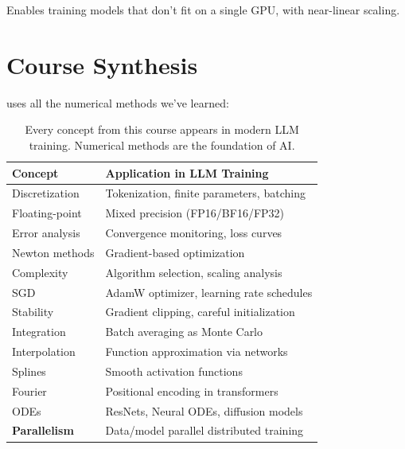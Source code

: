Enables training models that don't fit on a single GPU, with near-linear scaling.





\newpage
\section{Course Synthesis}

 uses all the numerical methods we've learned:

\begin{table}[ht]
\centering
\begin{tabular}{p{}p{}}
\toprule
\textbf{Concept} & \textbf{Application in LLM Training} \\
\midrule
Discretization & Tokenization, finite parameters, batching \\
Floating-point & Mixed precision (FP16/BF16/FP32) \\
Error analysis & Convergence monitoring, loss curves \\
Newton methods & Gradient-based optimization \\
Complexity & Algorithm selection, scaling analysis \\
SGD & AdamW optimizer, learning rate schedules \\
Stability & Gradient clipping, careful initialization \\
Integration & Batch averaging as Monte Carlo \\
Interpolation & Function approximation via networks \\
Splines & Smooth activation functions \\
Fourier & Positional encoding in transformers \\
ODEs & ResNets, Neural ODEs, diffusion models \\
\textbf{Parallelism} & Data/model parallel distributed training \\
\bottomrule
\end{tabular}
\vspace{2em}
\caption{Every concept from this course appears in modern LLM training. Numerical methods are the foundation of AI.}
\label{tab:course_synthesis}
\end{table}


